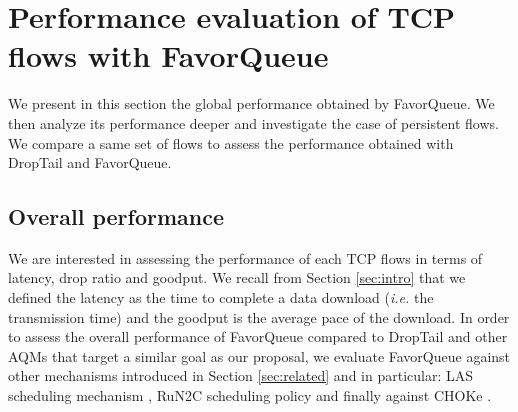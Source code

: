 \documentclass{elsart}
\begin{document}


\section{Performance evaluation of TCP flows with FavorQueue}
\label{sec:perf}

We present in this section the global performance obtained by FavorQueue. We then analyze its performance deeper and investigate the case of persistent flows. We compare a same set of flows to assess the performance obtained with DropTail and FavorQueue.


\subsection{Overall performance}
\label{subsec:overall}

We are interested in assessing the performance of each TCP flows in terms of latency, drop ratio and goodput.
We recall from Section \ref{sec:intro} that we defined the latency as the time to complete a data download (\textit{i.e.} the transmission time) and the goodput is the average pace of the download.
In order to assess the overall performance of FavorQueue compared to DropTail and other AQMs that target a similar goal as our proposal, 
we evaluate FavorQueue against other mechanisms introduced in Section \ref{sec:related} and in particular: LAS scheduling mechanism \cite{Kleinrock75}, RuN2C scheduling policy \cite{avrachenkov04} and finally against CHOKe \cite{pan00}.
\end{document}
